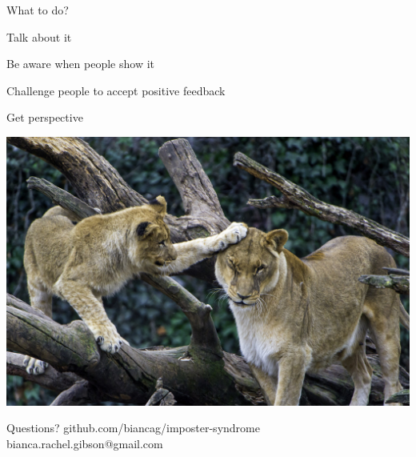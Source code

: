 \documentclass[aspectratio=169]{beamer}
\begin{document}
\begin{frame}
  \begin{center}
    \Huge What to do?
  \end{center}
\end{frame}

\begin{frame}
  \begin{center}
    \Huge Talk about it
    \small
  \end{center}
\end{frame}

\begin{frame}
  \begin{center}
    \Huge Be aware when people show it
    \small
  \end{center}
\end{frame}

\begin{frame}
  \begin{center}
    \Huge Challenge people to accept positive feedback
  \end{center}
\end{frame}

\begin{frame}
  \begin{center}
    \Huge Get perspective
    \small
  \end{center}
\end{frame}

\begin{frame}
  \begin{center}
    \includegraphics[scale=.3]{./assets/headpat.jpg}
  \end{center}
\end{frame}


\begin{frame}
  \begin{center}
    \Huge Questions?
    github.com/biancag/imposter-syndrome
    bianca.rachel.gibson@gmail.com
  \end{center}
\end{frame}

\begin{frame}
  

  
\end{frame}
\end{document}
